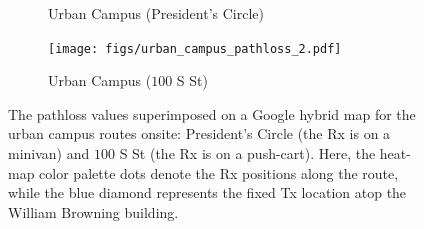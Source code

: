 \documentclass[12pt, draftcls, onecolumn]{IEEEtran}
\begin{document}
{\begin{figure} [t]
\begin{subfigure}{0.564\linewidth}
        \caption{Urban Campus (President's Circle)}
        \label{F5a}
    \end{subfigure}
    \begin{subfigure}{0.426\linewidth}
        \centering
        \texttt{[image: figs/urban\_campus\_pathloss\_2.pdf]}
        \caption{Urban Campus ($100$ S St)}
        \label{F5b}
    \end{subfigure}
    \vspace{-8mm}
    \caption{The pathloss values superimposed on a Google hybrid map for the urban campus routes onsite: President's Circle (the Rx is on a minivan) and $100$ S St (the Rx is on a push-cart). Here, the heat-map color palette dots denote the Rx positions along the route, while the blue diamond represents the fixed Tx location atop the William Browning building.}
    \label{F5}
\end{figure}

}
\end{document}
